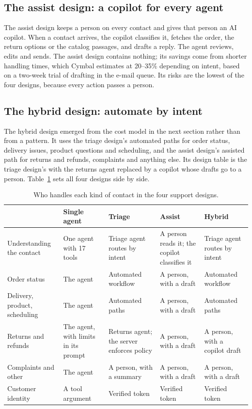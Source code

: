 \subsection{The assist design: a copilot for every agent}

The assist design keeps a person on every contact and gives that person an AI copilot. When a contact arrives, the copilot classifies it, fetches the order, the return options or the catalog passages, and drafts a reply. The agent reviews, edits and sends. The assist design contains nothing; its savings come from shorter handling times, which Cymbal estimates at 20--35\% depending on intent, based on a two-week trial of drafting in the e-mail queue. Its risks are the lowest of the four designs, because every action passes a person.

\subsection{The hybrid design: automate by intent}

The hybrid design emerged from the cost model in the next section rather than from a pattern. It uses the triage design's automated paths for order status, delivery issues, product questions and scheduling, and the assist design's assisted path for returns and refunds, complaints and anything else. Its design table is the triage design's with the returns agent replaced by a copilot whose drafts go to a person. Table~\ref{tab:support-alts} sets all four designs side by side.

\begin{table}[htbp]
\centering
\small
\caption{Who handles each kind of contact in the four support designs.}
\label{tab:support-alts}
\begin{tabularx}{\textwidth}{@{}>{\raggedright\arraybackslash}p{2.4cm}>{\raggedright\arraybackslash}X>{\raggedright\arraybackslash}X>{\raggedright\arraybackslash}X>{\raggedright\arraybackslash}X@{}}
\toprule
\rowcolor{coHead} & Single agent & Triage & Assist & Hybrid \\
\midrule
Understanding the contact & One agent with 17 tools & Triage agent routes by intent & A person reads it; the copilot classifies it & Triage agent routes by intent \\
Order status & The agent & Automated workflow & A person, with a draft & Automated workflow \\
Delivery, product, scheduling & The agent & Automated paths & A person, with a draft & Automated paths \\
Returns and refunds & The agent, with limits in its prompt & Returns agent; the server enforces policy & A person, with a draft & A person, with a copilot draft \\
Complaints and other & The agent & A person, with a summary & A person, with a draft & A person, with a draft \\
Customer identity & A tool argument & Verified token & Verified token & Verified token \\
\bottomrule
\end{tabularx}
\end{table}

